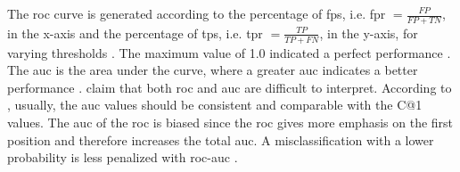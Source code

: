 The \ac{roc} curve is generated according to the percentage of \acp{fp}, i.e. \ac{fpr} $= \frac{FP}{FP+TN}$, in the x-axis and 
the percentage of \acp{tp}, i.e. \ac{tpr} $=\frac{TP}{TP+FN}$, in the y-axis,
for varying thresholds \cite{kocher_unine_2015,neal_surveying_2018}.
The maximum value of 1.0 indicated a perfect performance \cite{kocher_unine_2015}.
The \ac{auc} is the area under the curve, where a greater \ac{auc} indicates a better performance \cite{neal_surveying_2018}.
\citet{kocher_unine_2015} claim that both \ac{roc} and \ac{auc} are difficult to interpret.
According to \citet{kocher_unine_2015}, usually, the \ac{auc} values should be consistent and comparable with the C@1 values.
The \ac{auc} of the \ac{roc} is biased since the \ac{roc} gives more emphasis 
on the first position and therefore increases the total \ac{auc}.
A misclassification with a lower probability is less penalized with \ac{roc-auc} \cite{kocher_unine_2015}.